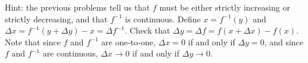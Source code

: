 \documentclass[letterpaper,12pt]{article}
\begin{document}
\begin{enumerate}
Hint: the previous problems tell us that $f$ must be either strictly increasing or strictly decreasing, and that $f^{-1}$ is continuous. Define $x=f^{-1}(y)$ and $\Delta x = f^{-1}(y+\Delta y)-x = \Delta f^{-1}$. Check that $\Delta y = \Delta f = f(x+\Delta x)-f(x)$. Note that since $f$ and $f^{-1}$ are one-to-one, $\Delta x = 0$ if and only if $\Delta y = 0$, and since $f$ and $f^{-1}$ are continuous, $\Delta x\to 0$ if and only if $\Delta y\to 0$. 




\end{enumerate}
\end{document}
